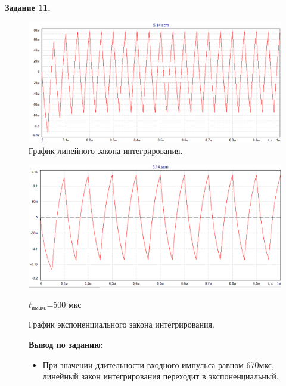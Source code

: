 \documentclass[a4paper,14pt]{extarticle}
\begin{document}
    \begin{center}
        \textbf{Задание 11.}
    \end{center}
    
    \begin{figure}[h!]
        \begin{center}
            \includegraphics[scale=0.5]{28.png}
        \end{center}
        \vspace{-0.7cm}
        \caption{График линейного закона интегрирования.}
    \end{figure}

    \begin{figure}[h!]
        \begin{center}
            \includegraphics[scale=0.5]{29.png}
        \end{center}
        \vspace{-0.7cm}
        \caption{График экспоненциального закона интегрирования.}
        $t_\text{имакс}$=500 мкс
    \end{figure}
    \begin{figure}[h!]
       \textbf{Вывод по заданию:}

        \begin{itemize}
            \item При значении длительности входного импульса равном 670мкс, линейный закон интегрирования переходит в экспоненциальный.
        \end{itemize}
    \end{figure}
\end{document}
